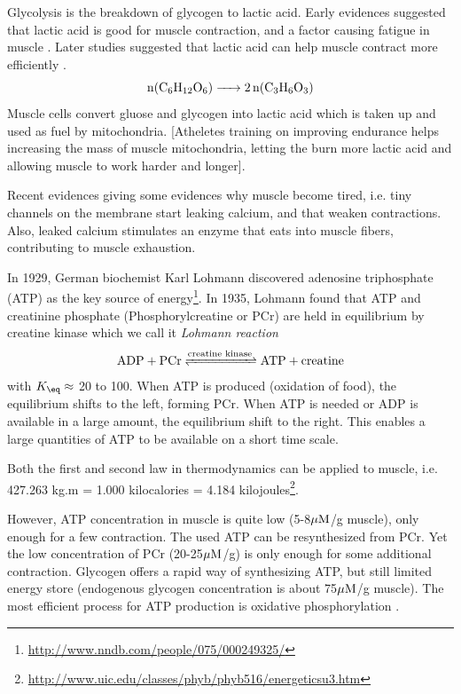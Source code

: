 Glycolysis is the
breakdown of glycogen to lactic acid. Early evidences suggested that lactic acid
is good for muscle contraction, and a factor causing fatigue in muscle
\citep{needham1971}.
Later studies suggested that lactic acid can help muscle contract more
efficiently \citep{pedersen2004}.
\begin{equation}
\ce{n(C6H12O6) -> 2n(C3H6O3)}
\end{equation}
Muscle cells convert gluose and glycogen into lactic acid which is taken up and
used as fuel by mitochondria. [Atheletes training on improving endurance helps
increasing the mass of muscle mitochondria, letting the burn more lactic acid
and allowing muscle to work harder and longer].

Recent evidences giving some evidences why muscle become tired, i.e. tiny
channels on the membrane start leaking calcium, and that weaken contractions.
Also, leaked calcium stimulates an enzyme that eats into muscle fibers,
contributing to muscle exhaustion.

In 1929, German biochemist Karl Lohmann discovered adenosine triphosphate (ATP)
as the key source of
energy\footnote{\url{http://www.nndb.com/people/075/000249325/}}. In 1935,
Lohmann found that ATP and creatinine phosphate (Phosphorylcreatine or PCr) are
held in equilibrium by creatine kinase which we call it {\it Lohmann reaction}
\begin{equation}
\ce{ADP + PCr <=>[\text{creatine kinase}] ATP + creatine}
\end{equation}
with $K_\eq \approx $ 20 to 100.  When ATP is produced (oxidation of food), the
equilibrium shifts to the left, forming PCr. When ATP is needed or ADP is
available in a large amount, the equilibrium shift to the right. This enables a
large quantities of ATP to be available on a short time scale.

Both the first and second law in thermodynamics can be applied to muscle, i.e.
427.263 kg.m = 1.000 kilocalories = 4.184
kilojoules\footnote{\url{http://www.uic.edu/classes/phyb/phyb516/energeticsu3.htm}}.

\begin{framed}
However, ATP
concentration in muscle is quite low (5-8${\mu\text{M}}$/g muscle), only enough for a few
contraction. The used ATP can be resynthesized from PCr. Yet the low
concentration of PCr (20-25${\mu\text{M}}$/g) is only enough for some additional
contraction. Glycogen offers a rapid way of synthesizing ATP, but still limited
energy store (endogenous glycogen concentration is about 75${\mu\text{M}}$/g muscle).
The most efficient process for ATP production is oxidative
phosphorylation \citep{paul1993}.
\end{framed}

